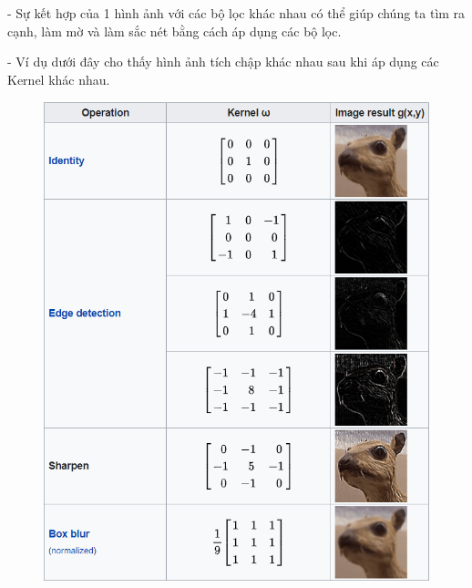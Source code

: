 \documentclass[12pt, a4paper]{article}
\begin{document}
\par \hspace{1cm}- Sự kết hợp của 1 hình ảnh với các bộ lọc khác nhau có thể giúp chúng ta tìm ra cạnh, làm mờ và làm sắc nét bằng cách áp dụng các bộ lọc. 
\par \hspace{1cm}- Ví dụ dưới đây cho thấy hình ảnh tích chập khác nhau sau khi áp dụng các Kernel khác nhau.
\begin{figure}[h] %
    \centering
    \includegraphics[scale = 0.45]{Img/cvl.png}
\end{figure}
\end{document}
